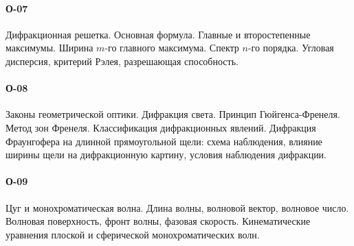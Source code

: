 \paragraph{О-07}
Дифракционная решетка. Основная формула. Главные и второстепенные максимумы. Ширина $m$-го главного максимума. Спектр $n$-го порядка. Угловая дисперсия, критерий Рэлея, разрешающая способность.

\paragraph{О-08}
Законы геометрической оптики. Дифракция света. Принцип Гюйгенса-Френеля. Метод зон Френеля. Классификация дифракционных явлений. Дифракция Фраунгофера на длинной прямоугольной щели: схема наблюдения, влияние ширины щели на дифракционную картину, условия наблюдения дифракции.

\paragraph{О-09}
Цуг и монохроматическая волна. Длина волны, волновой вектор, волновое число. Волновая поверхность, фронт волны, фазовая скорость. Кинематические уравнения плоской и сферической монохроматических волн.


